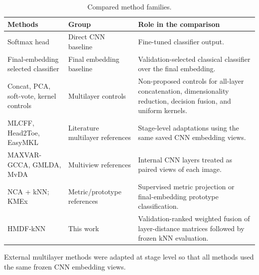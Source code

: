 \begin{table}[t]
\caption{Compared method families.}
\label{tab:method_groups}
\centering
\footnotesize
\setlength{\tabcolsep}{5pt}
\begin{tabular}{p{3.4cm}p{3.1cm}p{9.0cm}}
\toprule
Methods & Group & Role in the comparison \\
\midrule
Softmax head & Direct CNN baseline & Fine-tuned classifier output. \\
Final-embedding selected classifier & Final embedding baseline & Validation-selected classical classifier over the final embedding. \\
Concat, PCA, soft-vote, kernel controls & Multilayer controls & Non-proposed controls for all-layer concatenation, dimensionality reduction, decision fusion, and uniform kernels. \\
MLCFF, Head2Toe, EasyMKL & Literature multilayer references & Stage-level adaptations using the same saved CNN embedding views. \\
MAXVAR-GCCA, GMLDA, MvDA & Multiview references & Internal CNN layers treated as paired views of each image. \\
NCA + kNN; KMEx & Metric/prototype references & Supervised metric projection or final-embedding prototype classification. \\
HMDF-kNN & This work & Validation-ranked weighted fusion of layer-distance matrices followed by frozen kNN evaluation. \\
\bottomrule
\end{tabular}
\par\vspace{2pt}
\footnotesize External multilayer methods were adapted at stage level so that all methods used the same frozen CNN embedding views.
\end{table}
